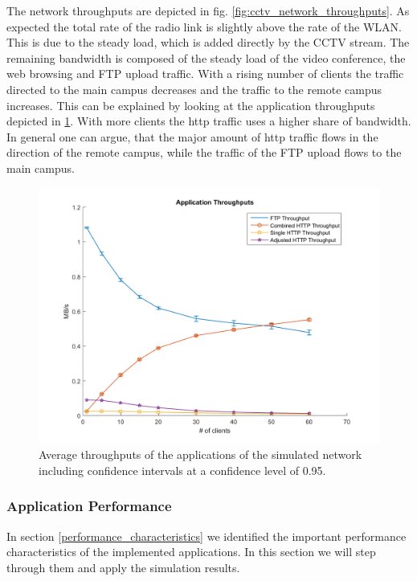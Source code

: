\documentclass[
10pt, %
a4paper, %
oneside, %
headinclude,footinclude, %
BCOR5mm, %
]{scrartcl}
\begin{document}
The network throughputs are depicted in fig. \ref{fig:cctv_network_throughputs}. As expected the total rate of the radio link is slightly above the rate of the WLAN. This is due to the steady load, which is added directly by the CCTV stream. The remaining bandwidth is composed of the steady load of the video conference, the web browsing and FTP upload traffic. With a rising number of clients the traffic directed to the main campus decreases and the traffic to the remote campus increases. This can be explained by looking at the application throughputs depicted in \ref{fig:cctv_app_throughput_all}. With more clients the http traffic uses a higher share of bandwidth. In general one can argue, that the major amount of http traffic flows in the direction of the remote campus, while the traffic of the FTP upload flows to the main campus.
\begin{figure}[!ht]
  \centering
  \includegraphics[width=\textwidth]{Figures/cctv/Application_Throughputs.png}
  \caption{Average throughputs of the applications of the simulated network including confidence intervals at a confidence level of 0.95.} \label{fig:cctv_app_throughput_all}
\end{figure}
\subsubsection{Application Performance}
In section \ref{performance_characteristics} we identified the important performance characteristics of the implemented applications. In this section we will step through them and apply the simulation results.
\end{document}
